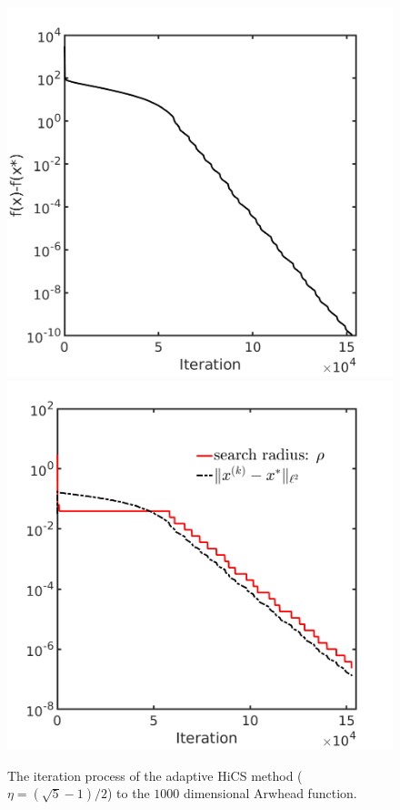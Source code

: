 \begin{figure}[!htbp]
	\centering
	  \includegraphics[scale=0.25]{../figures/arwhead1000D.png}
	  \includegraphics[scale=0.25]{../figures/arwhead1000D_dist.png}
  \caption{The iteration process of the adaptive HiCS method
  ($\eta=(\sqrt{5}-1)/2$) to the $1000$ dimensional Arwhead function.}
	\label{fig:arwhead}
\end{figure}

